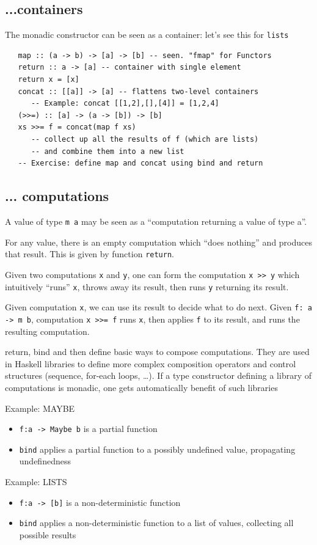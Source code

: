 \subsection{...containers}

The monadic constructor can be seen as a container:
let’s see this for \lstinline|lists|

\begin{lstlisting}
   map :: (a -> b) -> [a] -> [b] -- seen. "fmap" for Functors
   return :: a -> [a] -- container with single element
   return x = [x]
   concat :: [[a]] -> [a] -- flattens two-level containers
      -- Example: concat [[1,2],[],[4]] = [1,2,4]
   (>>=) :: [a] -> (a -> [b]) -> [b]
   xs >>= f = concat(map f xs)
      -- collect up all the results of f (which are lists)
      -- and combine them into a new list
   -- Exercise: define map and concat using bind and return
\end{lstlisting}

\subsection{... computations}

A value of type \lstinline|m a| may be seen as a ``computation returning a value of type a''.

For any value, there is an empty computation which ``does nothing'' and
produces that result. This is given by function \lstinline|return|.

Given two computations \lstinline|x| and \lstinline|y|, one can form the computation
\lstinline|x >> y| which intuitively ``runs'' \lstinline|x|, throws away its result, then runs \lstinline|y| returning its result.

Given computation \lstinline|x|, we can use its result to decide what to do next.
Given \lstinline|f: a -> m b|, computation \lstinline|x >>= f| runs \lstinline|x|, then applies
\lstinline|f| to its result, and runs the resulting computation.


return, bind and then define basic ways to compose computations.
They are used in Haskell libraries to define more complex composition
operators and control structures (sequence, for-each loops, \dots).
If a type constructor defining a library of computations is monadic, one
gets automatically benefit of such libraries

Example: MAYBE
\begin{itemize}
	\item \lstinline|f:a -> Maybe b| is a partial function
	\item \lstinline|bind| applies a partial function to a possibly undefined value, propagating undefinedness
\end{itemize}
Example: LISTS
\begin{itemize}
	\item \lstinline|f:a -> [b]| is a non-deterministic function
	\item \lstinline|bind| applies a non-deterministic function to a list of values, collecting all possible results

\end{itemize}
